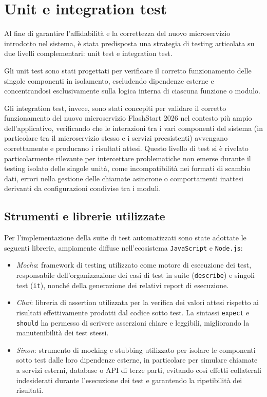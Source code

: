 \section{Unit e integration test}
Al fine di garantire l'affidabilità e la correttezza del nuovo microservizio introdotto nel sistema, è stata predisposta una strategia di testing articolata su due livelli complementari: unit test e integration test.

Gli unit test sono stati progettati per verificare il corretto funzionamento delle singole componenti in isolamento, escludendo dipendenze esterne e concentrandosi esclusivamente sulla logica interna di ciascuna funzione o modulo.

Gli integration test, invece, sono stati concepiti per validare il corretto funzionamento del nuovo microservizio FlashStart 2026 nel contesto più ampio dell'applicativo, verificando che le interazioni tra i vari componenti del sistema (in particolare tra il microservizio stesso e i servizi preesistenti) avvengano correttamente e producano i risultati attesi.
Questo livello di test si è rivelato particolarmente rilevante per intercettare problematiche non emerse durante il testing isolato delle singole unità, come incompatibilità nei formati di scambio dati, errori nella gestione delle chiamate asincrone o comportamenti inattesi derivanti da configurazioni condivise tra i moduli.

\subsection{Strumenti e librerie utilizzate}
Per l'implementazione della suite di test automatizzati sono state adottate le seguenti librerie, ampiamente diffuse nell'ecosistema \texttt{JavaScript} e \texttt{Node.js}:
\begin{itemize}
    \item \emph{Mocha}: framework di testing utilizzato come motore di esecuzione dei test, responsabile dell'organizzazione dei casi di test in suite (\texttt{describe}) e singoli test (\texttt{it}), nonché della generazione dei relativi report di esecuzione.
    \item \emph{Chai}: libreria di assertion utilizzata per la verifica dei valori attesi rispetto ai risultati effettivamente prodotti dal codice sotto test. La sintassi \texttt{expect} e \texttt{should} ha permesso di scrivere asserzioni chiare e leggibili, migliorando la manutenibilità dei test stessi.
    \item \emph{Sinon}: strumento di mocking e stubbing utilizzato per isolare le componenti sotto test dalle loro dipendenze esterne, in particolare per simulare chiamate a servizi esterni, database o \ac{API} di terze parti, evitando così effetti collaterali indesiderati durante l'esecuzione dei test e garantendo la ripetibilità dei risultati.
\end{itemize}

